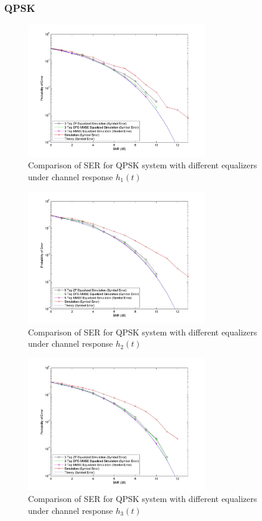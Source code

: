 \documentclass[]{article}
\begin{document}
\subsubsection{QPSK}

\begin{figure}[H]
\centering
\includegraphics[width=0.7\textwidth]{qpSNR1.jpg}
\caption{Comparison of SER for QPSK system with different equalizers under channel response $h_1(t)$}
\end{figure}

\begin{figure}[H]
\centering
\includegraphics[width=0.7\textwidth]{qpSNR2.jpg}
\caption{Comparison of SER for QPSK system with different equalizers under channel response $h_2(t)$}
\end{figure}

\begin{figure}[H]
\centering
\includegraphics[width=0.7\textwidth]{qpSNR3.jpg}
\caption{Comparison of SER for QPSK system with different equalizers under channel response $h_3(t)$}
\end{figure}
\end{document}
